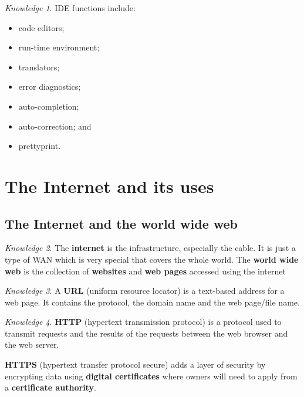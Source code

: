 \documentclass[8pt]{article}
\theoremstyle{remark}
\newtheorem{knowledge}{Knowledge}[subsection]
\begin{document}
            \begin{knowledge}
                IDE functions include:
                \begin{itemize}
                    \item code editors;
                    \item run-time environment;
                    \item translators;
                    \item error diagnostics;
                    \item auto-completion;
                    \item auto-correction; and
                    \item prettyprint.
                \end{itemize}
            \end{knowledge}

    \section{The Internet and its uses}
        
        \subsection{The Internet and the world wide web}

            \begin{knowledge}
                The \textbf{internet} is the infrastructure, especially the cable. It is just a type of WAN which is very special that covers the whole world. The \textbf{world wide web} is the collection of \textbf{websites} and \textbf{web pages} accessed using the internet
            \end{knowledge}

            \begin{knowledge}
                A \textbf{URL} (uniform resource locator) is a text-based address for a web page. It contains the protocol, the domain name and the web page/file name.
            \end{knowledge}

            \begin{knowledge}
                \textbf{HTTP} (hypertext transmission protocol) is a protocol used to transmit requests and the results of the requests between the web browser and the web server.
                
                \textbf{HTTPS} (hypertext transfer protocol secure) adds a layer of security by encrypting data using \textbf{digital certificates} where owners will need to apply from a \textbf{certificate authority}.
            \end{knowledge}
\end{document}
